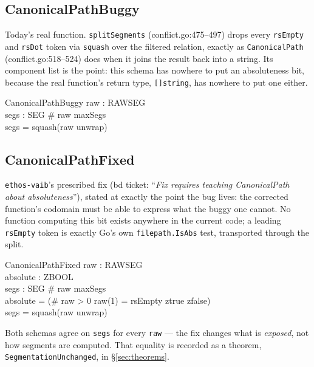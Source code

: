 \documentclass[a4paper,10pt,fleqn]{article}
\newcommand{\field}[1]{\texttt{#1}}
\begin{document}
\subsection{CanonicalPathBuggy}

Today's real function. \field{splitSegments} (conflict.go:475--497)
drops every \field{rsEmpty} and \field{rsDot} token via
\texttt{squash} over the filtered relation, exactly as
\field{CanonicalPath} (conflict.go:518--524) does when it joins the
result back into a string. Its component list is the point: this
schema has nowhere to put an absoluteness bit, because the real
function's return type, \texttt{[]string}, has nowhere to put one
either.

\begin{schema}{CanonicalPathBuggy}
raw : \seq RAWSEG \\
segs : \seq SEG
\where
\# raw \leq maxSegs \\
segs = squash(raw \comp unwrap)
\end{schema}

\subsection{CanonicalPathFixed}

\field{ethos-vaib}'s prescribed fix (bd ticket: ``\emph{Fix requires
teaching CanonicalPath about absoluteness}''), stated at exactly the
point the bug lives: the corrected function's codomain must be able
to express what the buggy one cannot. No function computing this bit
exists anywhere in the current code; a leading \field{rsEmpty} token
is exactly Go's own \field{filepath.IsAbs} test, transported through
the split.

\begin{schema}{CanonicalPathFixed}
raw : \seq RAWSEG \\
absolute : ZBOOL \\
segs : \seq SEG
\where
\# raw \leq maxSegs \\
absolute = (\IF \# raw > 0 \land raw(1) = rsEmpty \THEN ztrue \ELSE zfalse) \\
segs = squash(raw \comp unwrap)
\end{schema}

Both schemas agree on \field{segs} for every \field{raw} --- the fix
changes what is \emph{exposed}, not how segments are computed. That
equality is recorded as a theorem, \field{SegmentationUnchanged}, in
\S\ref{sec:theorems}.

\end{document}
